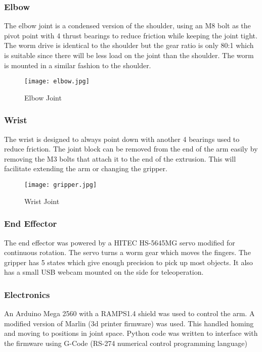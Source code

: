 \subsubsection{Elbow}
The elbow joint is a condensed version of the shoulder, using an M8 bolt as the pivot point with 4 thrust bearings to reduce friction while keeping the joint tight. The worm drive is identical to the shoulder but the gear ratio is only 80:1 which is suitable since there will be less load on the joint than the shoulder. The worm is mounted in a similar fashion to the shoulder.

\begin{figure}[!htb]
\begin{center}
\texttt{[image: elbow.jpg]}
\end{center}
\caption{Elbow Joint}
\label{fig:elbow}
\end{figure}

\subsubsection{Wrist}
The wrist is designed to always point down with another 4 bearings used to reduce friction. The joint block can be removed from the end of the arm easily by removing the M3 bolts that attach it to the end of the extrusion. This will facilitate extending the arm or changing the gripper.

\begin{figure}[!htb]
\begin{center}
\texttt{[image: gripper.jpg]}
\end{center}
\caption{Wrist Joint}
\label{fig:wrist}
\end{figure}

\subsubsection{End Effector}
The end effector was powered by a HITEC HS-5645MG servo modified for continuous rotation. The servo turns a worm gear which moves the fingers. The gripper has 5 states which give enough precision to pick up most objects. It also has a small USB webcam mounted on the side for teleoperation.


\subsubsection{Electronics}
An Arduino Mega 2560 with a RAMPS1.4 shield was used to control the arm. A modified version of Marlin (3d printer firmware) was used. This handled homing and moving to positions in joint space. Python code was written to interface with the firmware using G-Code  (RS-274 numerical control programming language) 

